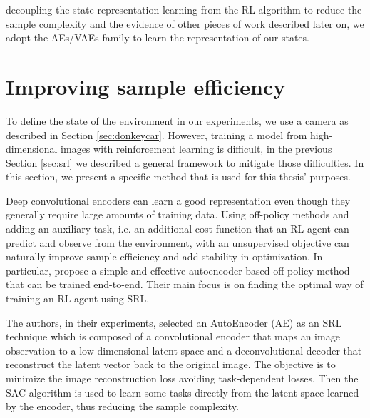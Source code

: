 decoupling the state representation learning from the RL algorithm to reduce the sample complexity and the evidence of other pieces of work described later on, we adopt the AEs/VAEs family to learn the representation of our states.

\section{Improving sample efficiency} \label{sec:sampleefficiency}
To define the state of the environment in our experiments, we use a camera as described in Section \ref{sec:donkeycar}. However, training a model from high-dimensional images with reinforcement learning is difficult, in the previous Section \ref{sec:srl} we described a general framework to mitigate those difficulties. In this section, we present a specific method that is used for this thesis' purposes.

Deep convolutional encoders can learn a good representation even though they generally require large amounts of training data. Using off-policy methods and adding an auxiliary task, i.e. an additional cost-function that an RL agent can predict and observe from the environment, with an unsupervised objective can naturally improve sample efficiency and add stability in optimization. In particular, \citet{DBLP:journals/corr/abs-1910-01741} propose a simple and effective autoencoder-based off-policy method that can be trained end-to-end. Their main focus is on finding the optimal way of training an RL agent using SRL.

The authors, in their experiments, selected an AutoEncoder (AE) as an SRL technique which is composed of a convolutional encoder that maps an image observation to a low dimensional latent space and a deconvolutional decoder that reconstruct the latent vector back to the original image. The objective is to minimize the image reconstruction loss avoiding task-dependent losses. Then the SAC algorithm is used to learn some tasks directly from the latent space learned by the encoder, thus reducing the sample complexity.

